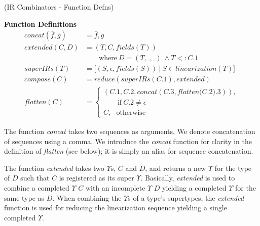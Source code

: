 \documentclass[10pt]{sigplanconf}
\theoremstyle{definition}
\theoremstyle{definition}
\newtheorem*{defn*}{Definition}
\begin{document}
\begin{defn}{(IR Combinators - Function Defns)}

\vspace{1em}

{\bf Function Definitions}
{\small
\begin{align*}
\textit{concat}(\overline{f}, \overline{g})& = \overline{f}, \overline{g}\\
\textit{extended}(C, D)&                     = (T, C, \textit{fields}(T))\\
                       &                       \qquad \mbox{where}~D = (T, \_, \_)~\land T <: C.1\\
\textit{superIRs}(T)&                        = \lbrack(S, \epsilon, \textit{fields}(S))~|~S\in \textit{linearization}(T)\rbrack\\
\textit{compose}(C)&                         = \textit{reduce}(\textit{superIRs}(C.1),\textit{extended})\\
\textit{flatten}(C)&                         =\left\{ \begin{array}{l}
                                                (C.1, C.2, \textit{concat}(C.3, \textit{flatten(C.2).3})),\\
                                                \qquad\mbox{if}~C.2\neq\epsilon\\
                                                C,~~~\mbox{otherwise}
                                              \end{array} \right.
\end{align*}
}%


The function \textit{concat} takes two sequences as arguments. We
denote concatenation of sequences using a comma. We introduce the
\textit{concat} function for clarity in the definition of \textit{flatten}
(see below); it is simply an alias for sequence concatenation.





The function \textit{extended} takes two $\Upsilon$s, $C$ and $D$, and returns a new
$\Upsilon$ for the type of $D$ such that $C$ is registered as its super $\Upsilon$.
Basically, \textit{extended} is used to combine a completed $\Upsilon$ $C$ with an
incomplete $\Upsilon$ $D$ yielding a completed $\Upsilon$ for the same type as $D$. When
combining the $\Upsilon$s of a type's supertypes, the \textit{extended} function is
used for reducing the linearization sequence yielding a single completed $\Upsilon$.


\end{defn}
\end{document}
